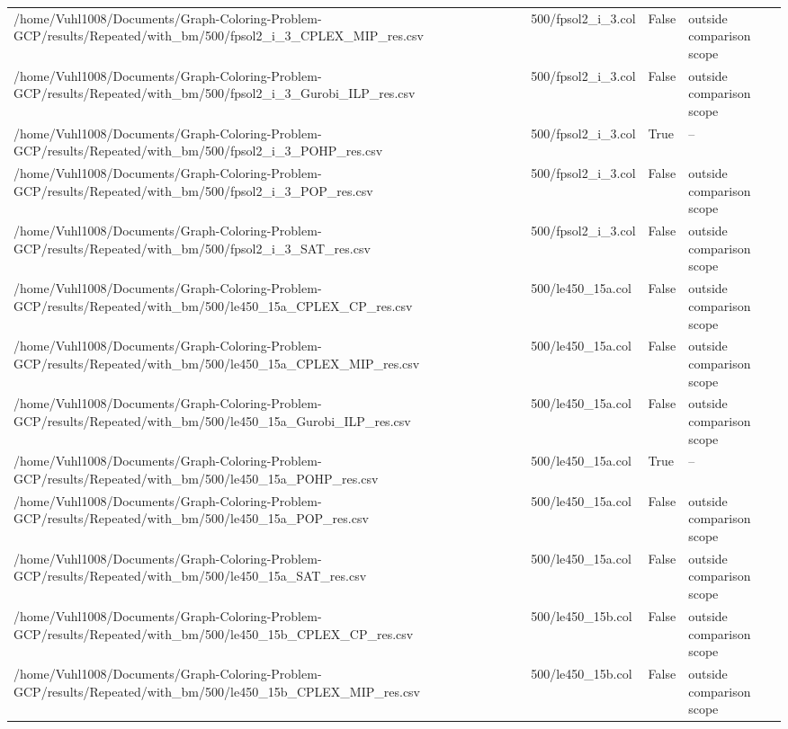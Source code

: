 \begin{table}[htbp]
\begin{tabular}{llll}
/home/Vuhl1008/Documents/Graph-Coloring-Problem-GCP/results/Repeated/with\_bm/500/fpsol2\_i\_3\_CPLEX\_MIP\_res.csv & 500/fpsol2\_i\_3.col & False & outside comparison scope \\
/home/Vuhl1008/Documents/Graph-Coloring-Problem-GCP/results/Repeated/with\_bm/500/fpsol2\_i\_3\_Gurobi\_ILP\_res.csv & 500/fpsol2\_i\_3.col & False & outside comparison scope \\
/home/Vuhl1008/Documents/Graph-Coloring-Problem-GCP/results/Repeated/with\_bm/500/fpsol2\_i\_3\_POHP\_res.csv & 500/fpsol2\_i\_3.col & True & -- \\
/home/Vuhl1008/Documents/Graph-Coloring-Problem-GCP/results/Repeated/with\_bm/500/fpsol2\_i\_3\_POP\_res.csv & 500/fpsol2\_i\_3.col & False & outside comparison scope \\
/home/Vuhl1008/Documents/Graph-Coloring-Problem-GCP/results/Repeated/with\_bm/500/fpsol2\_i\_3\_SAT\_res.csv & 500/fpsol2\_i\_3.col & False & outside comparison scope \\
/home/Vuhl1008/Documents/Graph-Coloring-Problem-GCP/results/Repeated/with\_bm/500/le450\_15a\_CPLEX\_CP\_res.csv & 500/le450\_15a.col & False & outside comparison scope \\
/home/Vuhl1008/Documents/Graph-Coloring-Problem-GCP/results/Repeated/with\_bm/500/le450\_15a\_CPLEX\_MIP\_res.csv & 500/le450\_15a.col & False & outside comparison scope \\
/home/Vuhl1008/Documents/Graph-Coloring-Problem-GCP/results/Repeated/with\_bm/500/le450\_15a\_Gurobi\_ILP\_res.csv & 500/le450\_15a.col & False & outside comparison scope \\
/home/Vuhl1008/Documents/Graph-Coloring-Problem-GCP/results/Repeated/with\_bm/500/le450\_15a\_POHP\_res.csv & 500/le450\_15a.col & True & -- \\
/home/Vuhl1008/Documents/Graph-Coloring-Problem-GCP/results/Repeated/with\_bm/500/le450\_15a\_POP\_res.csv & 500/le450\_15a.col & False & outside comparison scope \\
/home/Vuhl1008/Documents/Graph-Coloring-Problem-GCP/results/Repeated/with\_bm/500/le450\_15a\_SAT\_res.csv & 500/le450\_15a.col & False & outside comparison scope \\
/home/Vuhl1008/Documents/Graph-Coloring-Problem-GCP/results/Repeated/with\_bm/500/le450\_15b\_CPLEX\_CP\_res.csv & 500/le450\_15b.col & False & outside comparison scope \\
/home/Vuhl1008/Documents/Graph-Coloring-Problem-GCP/results/Repeated/with\_bm/500/le450\_15b\_CPLEX\_MIP\_res.csv & 500/le450\_15b.col & False & outside comparison scope \\

\end{tabular}
\end{table}

